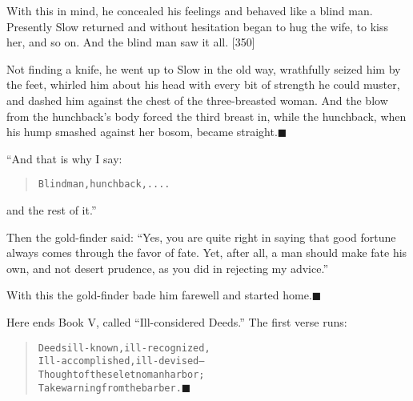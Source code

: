 \documentclass[article, twoside, 14pt]{memoir}
\newcommand{\qed}{\hfill \ensuremath{\blacksquare}}
\renewenvironment{verbatim}{%
\begin{quote}%
\vskip -10pt%
\begin{alltt}\normalfont\large}{\end{alltt}%
\end{quote}%
\vskip -10pt
} %
\begin{document}
With this in mind, he concealed his feelings and behaved like a
blind man. Presently Slow returned and without hesitation began to
hug the wife, to kiss her, and so on. And the blind man saw it all.
[350]

Not finding a knife, he went up to Slow in the old way, wrathfully
seized him by the feet, whirled him about his head with every bit
of strength he could muster, and dashed him against the chest of
the three-breasted woman. And the blow from the hunchback's body
forced the third breast in, while the hunchback, when his hump
smashed against her bosom, became straight.\hyperref[s89]{\qed}

“And that is why I say:

\begin{verbatim}
Blind man, hunchback, . . . .
\end{verbatim}
and the rest of it.”

Then the gold-finder said:
``Yes, you are quite right in saying that good fortune always comes through the favor of fate. Yet, after all, a man should make fate his own, and not desert prudence, as you did in rejecting my advice.''

With this the gold-finder bade him farewell and started
home.\hyperref[s81]{\qed}

Here ends Book V, called ``Ill-considered Deeds.'' The first verse
runs:

\begin{verbatim}
Deeds ill-known, ill-recognized,
Ill-accomplished, ill-devised--
Thought of these let no man harbor;
Take warning from the barber.\hyperref[s80]{\qed}
\end{verbatim}
\end{document}
